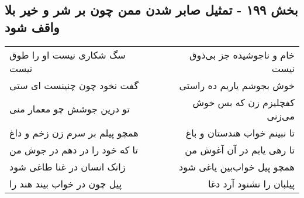 \begin{center}
\section*{بخش ۱۹۹ - تمثیل صابر شدن ممن چون بر شر و خیر بلا واقف شود}
\label{sec:sh199}
\begin{longtable}{l p{0.5cm} r}
سگ شکاری نیست او را طوق نیست
&&
خام و ناجوشیده جز بی‌ذوق نیست
\\
گفت نخود چون چنینست ای ستی
&&
خوش بجوشم یاریم ده راستی
\\
تو درین جوشش چو معمار منی
&&
کفچلیزم زن که بس خوش می‌زنی
\\
همچو پیلم بر سرم زن زخم و داغ
&&
تا نبینم خواب هندستان و باغ
\\
تا که خود را در دهم در جوش من
&&
تا رهی یابم در آن آغوش من
\\
زانک انسان در غنا طاغی شود
&&
همچو پیل خواب‌بین یاغی شود
\\
پیل چون در خواب بیند هند را
&&
پیلبان را نشنود آرد دغا
\\
\end{longtable}
\end{center}
